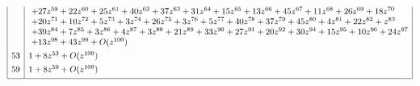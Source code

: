 \documentclass[11pt,leqno]{article}
\theoremstyle{remark}
\theoremstyle{definition}
\begin{document}
\begin{table}
\begin{equation*}
\begin{array}{|c|l|}
&~+ 27 z^{59} + 22 z^{60} + 25 z^{61} + 40 z^{62} + 37 z^{63} + 31 z^{64} + 15 z^{65} + 13 z^{66} + 45 z^{67} + 11 z^{68} + 26 z^{69} + 18 z^{70}\\
&~+ 20 z^{71} + 10 z^{72} + 5 z^{73} + 3 z^{74} + 26 z^{75} + 3 z^{76} + 5 z^{77} + 40 z^{78} + 37 z^{79} + 45 z^{80} + 4 z^{81} + 22 z^{82} +  z^{83}\\
&~+ 39 z^{84} + 7 z^{85} + 3 z^{86} + 4 z^{87} + 3 z^{88} + 21 z^{89} + 33 z^{90} + 27 z^{91} + 20 z^{92} + 30 z^{94} + 15 z^{95} + 10 z^{96} + 24 z^{97}\\
&~+ 13 z^{98} + 43 z^{99} + O(z^{100}) \\[4pt]
53 & 1 + 8 z^{53} + O(z^{100}) \\[4pt]
59 & 1 + 8 z^{59} + O(z^{100}) \\[4pt]
\hline
\end{array}
\end{equation*}
\caption{ $A_p(z)$ of $\mathcal{L}$ for small primes $p$.}
\label{table: A_p(z) at small primes for pullback of operator 1hat}
\end{table}
\end{document}
